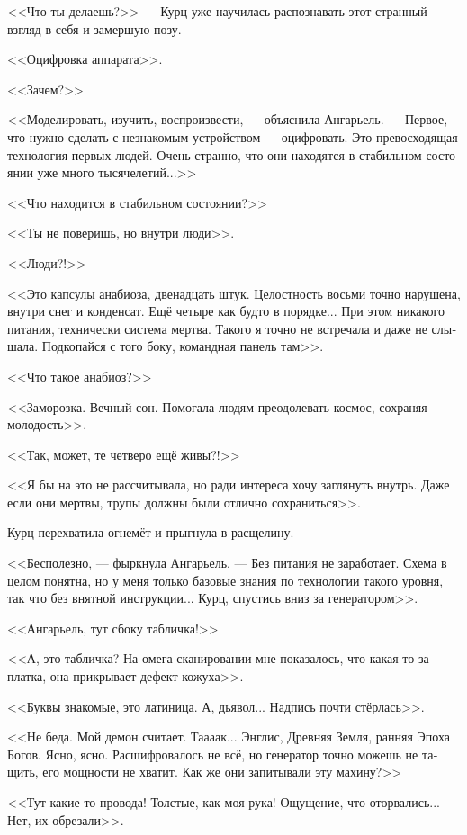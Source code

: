 \documentclass[a4paper,12pt,fleqn]{book}\usepackage{polyglossia}\setdefaultlanguage[babelshorthands=true]{russian}\setotherlanguage{english}\defaultfontfeatures{Ligatures=TeX,Mapping=tex-text}\usepackage{xcolor}\newcommand{\ml}[3]{#2}
\begin{document}
<<Что ты делаешь?>> --- Курц уже научилась распознавать этот странный взгляд в себя и замершую позу.

<<Оцифровка аппарата>>.

<<Зачем?>>

<<Моделировать, изучить, воспроизвести, --- объяснила Ангарьель.
--- Первое, что нужно сделать с незнакомым устройством --- оцифровать.
Это превосходящая технология первых людей.
Очень странно, что они находятся в стабильном состоянии уже много тысячелетий...>>

<<Что находится в стабильном состоянии?>>

<<Ты не поверишь, но внутри люди>>.

<<Люди?!>>

<<Это капсулы анабиоза, двенадцать штук.
Целостность восьми точно нарушена, внутри снег и конденсат.
Ещё четыре как будто в порядке...
При этом никакого питания, технически система мертва.
Такого я точно не встречала и даже не слышала.
Подкопайся с того боку, командная панель там>>.

<<Что такое анабиоз?>>

<<Заморозка.
Вечный сон.
Помогала людям преодолевать космос, сохраняя молодость>>.

<<Так, может, те четверо ещё живы?!>>

<<Я бы на это не рассчитывала, но ради интереса хочу заглянуть внутрь.
Даже если они мертвы, трупы должны были отлично сохраниться>>.

Курц перехватила огнемёт и прыгнула в расщелину.

<<Бесполезно, --- фыркнула Ангарьель.
--- Без питания не заработает.
Схема в целом понятна, но у меня только базовые знания по технологии такого уровня, так что без внятной инструкции...
Курц, спустись вниз за генератором>>.

<<Ангарьель, тут сбоку табличка!>>

<<А, это табличка?
На омега-сканировании мне показалось, что какая-то заплатка, она прикрывает дефект кожуха>>.

<<Буквы знакомые, это латиница.
А, дьявол...
Надпись почти стёрлась>>.

<<Не беда.
Мой демон считает.
Таааак...
Энглис, Древняя Земля, ранняя Эпоха Богов.
Ясно, ясно.
Расшифровалось не всё, но генератор точно можешь не тащить, его мощности не хватит.
Как же они запитывали эту махину?>>

<<Тут какие-то провода!
Толстые, как моя рука!
Ощущение, что оторвались...
Нет, их обрезали>>.
\end{document}
